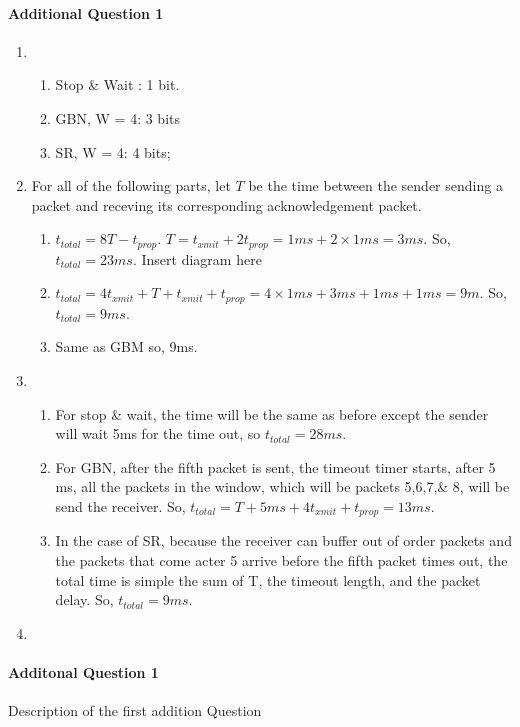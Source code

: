 \documentclass[12pt]{article}
\begin{document}
\paragraph{Additional Question 1}
\begin{enumerate}[label=\textbf{Part \arabic*)}]
	\item 
		\begin{enumerate}[label=\textbf{\alph*)}]
			\item Stop \& Wait : 1 bit.
			\item GBN, W = 4: 3 bits
			\item SR, W = 4: 4 bits;
		\end{enumerate}
	\item For all of the following parts, let $T$ be the time between the sender sending a packet and receving its corresponding acknowledgement packet.
		\begin{enumerate}[label=\textbf{\alph*)}]
			\item $t_{total} = 8T - t_{prop}$. $T = t_{xmit} + 2t_{prop} = 1ms + 2 \times 1ms = 3ms$. So, $t_{total} = 23ms$.
			Insert diagram here
			\item $t_{total} = 4t_{xmit} + T + t_{xmit} + t_{prop} = 4 \times 1ms + 3ms + 1ms + 1ms = 9 m$. So, $t_{total} = 9ms$.
			\item Same as GBM so, 9ms.
		\end{enumerate}
	\item
		\begin{enumerate}[label=\textbf{\alph*)}]
			\item For stop \& wait, the time will be the same as before except the sender will wait 5ms for the time out, so $t_{total} = 28ms$.
			\item For GBN, after the fifth packet is sent, the timeout timer starts, after 5 ms, all the packets in the window, which will be packets 5,6,7,\& 8, will be send the receiver. So, $t_{total} = T + 5ms + 4t_{xmit} + t_{prop} = 13ms$.
			\item In the case of SR, because the receiver can buffer out of order packets and the packets that come acter 5 arrive before the fifth packet times out, the total time is simple the sum of T, the timeout length, and the packet delay. So, $t_{total} = 9ms$.
		\end{enumerate}
	\item
\end{enumerate}


\paragraph{Additonal Question 1}
Description of the first addition Question
\end{document}
